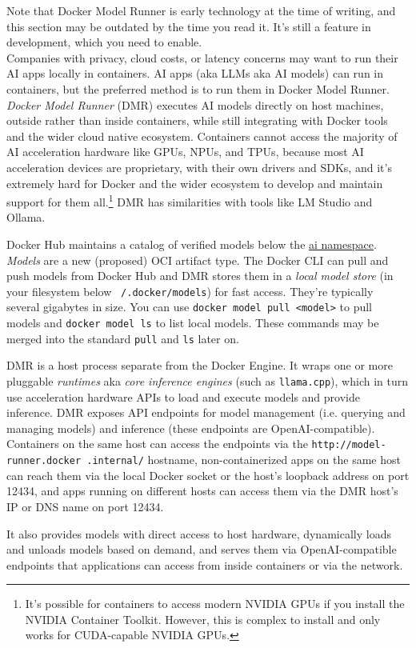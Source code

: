 \documentclass[table, xcdraw]{article}%
\begin{document}
Note that Docker Model Runner is early technology at the time of writing, and this section may be outdated by the time you read it. It's still a feature in development, which you need to enable.\\
Companies with privacy, cloud costs, or latency concerns may want to run their AI apps locally in containers. AI apps (aka LLMs aka AI models) can run in containers, but the preferred method is to run them in Docker Model Runner. \emph{Docker Model Runner} (DMR) executes AI models directly on host machines, outside rather than inside containers, while still integrating with Docker tools and the wider cloud native ecosystem. Containers cannot access the majority of AI acceleration hardware like GPUs, NPUs, and TPUs, because most AI acceleration devices are proprietary, with their own drivers and SDKs, and it’s extremely hard for Docker and the wider ecosystem to develop and maintain support for them all.\footnote{It’s possible for containers to access modern NVIDIA GPUs if you install the NVIDIA Container Toolkit. However, this is complex to install and only works for CUDA-capable NVIDIA GPUs.} DMR has similarities with tools like LM Studio and Ollama.

Docker Hub maintains a catalog of verified models below the \href{https://hub.docker.com/u/ai}{ai namespace}. \emph{Models} are a new (proposed) OCI artifact type. The Docker CLI can pull and push models from Docker Hub and DMR stores them in a \emph{local model store} (in your filesystem below \texttt{~/.docker/models}) for fast access. They're typically several gigabytes in size. You can use \texttt{docker model pull <model>} to pull models and \texttt{docker model ls} to list local models. These commands may be merged into the standard \texttt{pull} and \texttt{ls} later on.

DMR is a host process separate from the Docker Engine. It wraps one or more pluggable \emph{runtimes} aka \emph{core inference engines} (such as \texttt{llama.cpp}), which in turn use acceleration hardware APIs to load and execute models and provide inference. DMR exposes API endpoints for model management (i.e. querying and managing models) and inference (these endpoints are OpenAI-compatible). Containers on the same host can access the endpoints via the \texttt{http://model-runner.docker .internal/} hostname, non-containerized apps on the same host can reach them via the local Docker socket or the host’s loopback address on port 12434, and apps running on different hosts can access them via the DMR host’s IP or DNS name on port 12434.

It also provides models with direct access to host hardware, dynamically loads and unloads models based on demand, and serves them via OpenAI-compatible endpoints that applications can access from inside containers or via the network.
\end{document}
